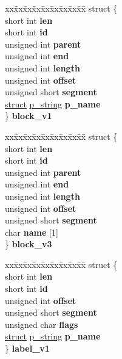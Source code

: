 \begin{DoxyCompactItemize}
\begin{tabbing}
\end{tabbing}\item 
\mbox{\label{unioncodeview__symbol_a7e44d28c8b28cf616a09286dcedd709d}} 
\begin{tabbing}
xx\=xx\=xx\=xx\=xx\=xx\=xx\=xx\=xx\=\kill
struct \{\\
\>short int {\bfseries len}\\
\>short int {\bfseries id}\\
\>unsigned int {\bfseries parent}\\
\>unsigned int {\bfseries end}\\
\>unsigned int {\bfseries length}\\
\>unsigned int {\bfseries offset}\\
\>unsigned short {\bfseries segment}\\
\>\hyperlink{interfacestruct}{struct} \hyperlink{structp__string}{p\_string} {\bfseries p\_name}\\
\} {\bfseries block\_v1}\\

\end{tabbing}\item 
\mbox{\label{unioncodeview__symbol_ae3da820d6be6c3140e5b15fdaaee98e3}} 
\begin{tabbing}
xx\=xx\=xx\=xx\=xx\=xx\=xx\=xx\=xx\=\kill
struct \{\\
\>short int {\bfseries len}\\
\>short int {\bfseries id}\\
\>unsigned int {\bfseries parent}\\
\>unsigned int {\bfseries end}\\
\>unsigned int {\bfseries length}\\
\>unsigned int {\bfseries offset}\\
\>unsigned short {\bfseries segment}\\
\>char {\bfseries name} \mbox{[}1\mbox{]}\\
\} {\bfseries block\_v3}\\

\end{tabbing}\item 
\mbox{\label{unioncodeview__symbol_affd030c27d2c3da29dd06c8acd6175b7}} 
\begin{tabbing}
xx\=xx\=xx\=xx\=xx\=xx\=xx\=xx\=xx\=\kill
struct \{\\
\>short int {\bfseries len}\\
\>short int {\bfseries id}\\
\>unsigned int {\bfseries offset}\\
\>unsigned short {\bfseries segment}\\
\>unsigned char {\bfseries flags}\\
\>\hyperlink{interfacestruct}{struct} \hyperlink{structp__string}{p\_string} {\bfseries p\_name}\\
\} {\bfseries label\_v1}\\


\end{tabbing}
\end{DoxyCompactItemize}
